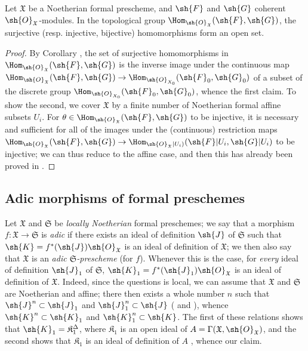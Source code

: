 \begin{proposition}[10.11.9]
\label{I.10.11.9}
Let $\mathfrak{X}$ be a Noetherian formal prescheme, and $\sh{F}$ and $\sh{G}$ coherent $\sh{O}_\mathfrak{X}$-modules.
In the topological group $\Hom_{\sh{O}_\mathfrak{X}}(\sh{F},\sh{G})$, the surjective (resp. injective, bijective) homomorphisms form an open set.
\end{proposition}

\begin{proof}
By Corollary , the set of surjective homomorphisms in $\Hom_{\sh{O}_\mathfrak{X}}(\sh{F},\sh{G})$ is the inverse image under the continuous map $\Hom_{\sh{O}_\mathfrak{X}}(\sh{F},\sh{G})\to\Hom_{\sh{O}_{X_0}}(\sh{F}_0,\sh{G}_0)$ of a subset of the discrete group $\Hom_{\sh{O}_{X_0}}(\sh{F}_0,\sh{G}_0)$, whence the first claim.
To show the second, we cover $\mathfrak{X}$ by a finite number of Noetherian formal affine subsets $U_i$.
For $\theta\in\Hom_{\sh{O}_\mathfrak{X}}(\sh{F},\sh{G})$ to be injective, it is necessary and sufficient for all of the images under the (continuous) restriction maps $\Hom_{\sh{O}_\mathfrak{X}}(\sh{F},\sh{G})\to\Hom_{\sh{O}_\mathfrak{X}|U_i)}(\sh{F}|U_i,\sh{G}|U_i)$ to be injective; we can thus reduce to the affine case, and then this has already been proved in .
\end{proof}

\subsection{Adic morphisms of formal preschemes}
\label{subsection:I.10.12}

\begin{env}[10.12.1]
\label{I.10.12.1}
Let $\mathfrak{X}$ and $\mathfrak{S}$ be \emph{locally Noetherian} formal preschemes;
we say that a morphism $f:\mathfrak{X}\to\mathfrak{S}$ is \emph{adic} if there exists an ideal of definition $\sh{J}$ of $\mathfrak{S}$ such that $\sh{K}=f^*(\sh{J})\sh{O}_\mathfrak{X}$ is an ideal of definition of $\mathfrak{X}$;
we then also say that $\mathfrak{X}$ is an \emph{adic $\mathfrak{S}$-prescheme} (for $f$).
Whenever this is the case, for \emph{every} ideal of definition $\sh{J}_1$ of $\mathfrak{S}$, $\sh{K}_1=f^*(\sh{J}_1)\sh{O}_\mathfrak{X}$ is an ideal of definition of $\mathfrak{X}$.
Indeed, since the questions is local, we can assume that $\mathfrak{X}$ and $\mathfrak{S}$ are Noetherian and affine;
there then exists a whole number $n$ such that $\sh{J}^n\subset\sh{J}_1$ and $\sh{J}_1^n\subset\sh{J}$ ( and ), whence $\sh{K}^n\subset\sh{K}_1$ and $\sh{K}_1^n\subset\sh{K}$.
The first of these relations shows that $\sh{K}_1=\mathfrak{K}_1^\Delta$, where $\mathfrak{K}_1$ is an open ideal of $A=\Gamma(\mathfrak{X},\sh{O}_\mathfrak{X})$, and the second shows that $\mathfrak{K}_1$ is an ideal of definition of $A$ , whence our claim.
\end{env}

